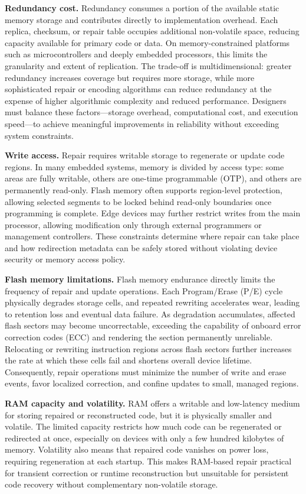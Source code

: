 \textbf{Redundancy cost.}  
Redundancy consumes a portion of the available static memory storage and contributes directly to implementation overhead. Each replica, checksum, or repair table occupies additional non-volatile space, reducing capacity available for primary code or data. On memory-constrained platforms such as microcontrollers and deeply embedded processors, this limits the granularity and extent of replication. The trade-off is multidimensional: greater redundancy increases coverage but requires more storage, while more sophisticated repair or encoding algorithms can reduce redundancy at the expense of higher algorithmic complexity and reduced performance. Designers must balance these factors—storage overhead, computational cost, and execution speed—to achieve meaningful improvements in reliability without exceeding system constraints.

\textbf{Write access.}  
Repair requires writable storage to regenerate or update code regions. In many embedded systems, memory is divided by access type: some areas are fully writable, others are one-time programmable (OTP), and others are permanently read-only. Flash memory often supports region-level protection, allowing selected segments to be locked behind read-only boundaries once programming is complete. Edge devices may further restrict writes from the main processor, allowing modification only through external programmers or management controllers. These constraints determine where repair can take place and how redirection metadata can be safely stored without violating device security or memory access policy.

\textbf{Flash memory limitations.}  
Flash memory endurance directly limits the frequency of repair and update operations. Each Program/Erase (P/E) cycle physically degrades storage cells, and repeated rewriting accelerates wear, leading to retention loss and eventual data failure. As degradation accumulates, affected flash sectors may become uncorrectable, exceeding the capability of onboard error correction codes (ECC) and rendering the section permanently unreliable. Relocating or rewriting instruction regions across flash sectors further increases the rate at which these cells fail and shortens overall device lifetime. Consequently, repair operations must minimize the number of write and erase events, favor localized correction, and confine updates to small, managed regions.

\textbf{RAM capacity and volatility.}  
RAM offers a writable and low-latency medium for storing repaired or reconstructed code, but it is physically smaller and volatile. The limited capacity restricts how much code can be regenerated or redirected at once, especially on devices with only a few hundred kilobytes of memory. Volatility also means that repaired code vanishes on power loss, requiring regeneration at each startup. This makes RAM-based repair practical for transient correction or runtime reconstruction but unsuitable for persistent code recovery without complementary non-volatile storage.

